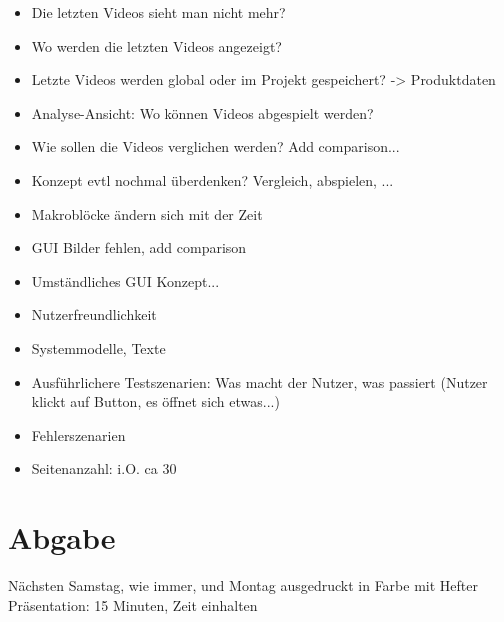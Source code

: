 \documentclass[parskip=full]{scrartcl}
\theoremstyle{mytheor}
\begin{document}
\begin{itemize}
\item Die letzten Videos sieht man nicht mehr?
\item Wo werden die letzten Videos angezeigt?
\item Letzte Videos werden global oder im Projekt gespeichert? -> Produktdaten
\item Analyse-Ansicht: Wo können Videos abgespielt werden?
\item Wie sollen die Videos verglichen werden? Add comparison...
\item Konzept evtl nochmal überdenken? Vergleich, abspielen, ...
\item Makroblöcke ändern sich mit der Zeit
\item GUI Bilder fehlen, add comparison
\item Umständliches GUI Konzept...
\item Nutzerfreundlichkeit
\item Systemmodelle, Texte
\item Ausführlichere Testszenarien: Was macht der Nutzer, was passiert (Nutzer klickt auf Button, es öffnet sich etwas...)
\item Fehlerszenarien
\item Seitenanzahl: i.O. ca 30
\end{itemize}

\section{Abgabe}
Nächsten Samstag, wie immer, und Montag ausgedruckt in Farbe mit Hefter
Präsentation: 15 Minuten, Zeit einhalten
\end{document}
